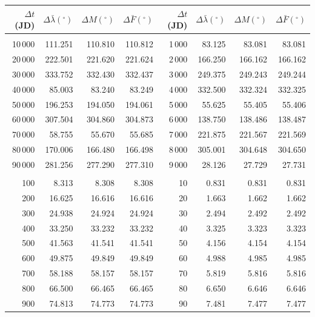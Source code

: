 \clearpage
\begin{table}[!h]
\vspace{0.25cm}
\centering
\begin{tabular}{rrrr|rrrr}
$\Delta t$(JD)& $\Delta\bar{\lambda}(^\circ)$ &  $\Delta M(^\circ)$ & $\Delta \bar{F}(^\circ)$& $\Delta t$(JD) & $\Delta\bar{\lambda}(^\circ)$ & $\Delta M(^\circ)$ 
&$\Delta \bar{F}(^\circ)$\\ \hline
&&&&&&&\\[-1.75ex]
10\,000 & 111.251 & 110.810 & 110.812 & 1\,000 &  83.125 &  83.081 &  83.081\\
20\,000 & 222.501 & 221.620 & 221.624 & 2\,000 & 166.250 & 166.162 & 166.162\\
30\,000 & 333.752 & 332.430 & 332.437 & 3\,000 & 249.375 & 249.243 & 249.244\\
40\,000 &  85.003 &  83.240 &  83.249 & 4\,000 & 332.500 & 332.324 & 332.325\\
50\,000 & 196.253 & 194.050 & 194.061 & 5\,000 &  55.625 &  55.405 &  55.406\\
60\,000 & 307.504 & 304.860 & 304.873 & 6\,000 & 138.750 & 138.486 & 138.487\\
70\,000 &  58.755 &  55.670 &  55.685 & 7\,000 & 221.875 & 221.567 & 221.569\\
80\,000 & 170.006 & 166.480 & 166.498 & 8\,000 & 305.001 & 304.648 & 304.650\\
90\,000 & 281.256 & 277.290 & 277.310 & 9\,000 &  28.126 &  27.729 &  27.731\\
&&&&&&&\\
100 &   8.313 &   8.308 &   8.308 & 10 &   0.831 &   0.831 &   0.831\\
200 &  16.625 &  16.616 &  16.616 & 20 &   1.663 &   1.662 &   1.662\\
300 &  24.938 &  24.924 &  24.924 & 30 &   2.494 &   2.492 &   2.492\\
400 &  33.250 &  33.232 &  33.232 & 40 &   3.325 &   3.323 &   3.323\\
500 &  41.563 &  41.541 &  41.541 & 50 &   4.156 &   4.154 &   4.154\\
600 &  49.875 &  49.849 &  49.849 & 60 &   4.988 &   4.985 &   4.985\\
700 &  58.188 &  58.157 &  58.157 & 70 &   5.819 &   5.816 &   5.816\\
800 &  66.500 &  66.465 &  66.465 & 80 &   6.650 &   6.646 &   6.646\\
900 &  74.813 &  74.773 &  74.773 & 90 &   7.481 &   7.477 &   7.477\\

\end{tabular}
\end{table}
